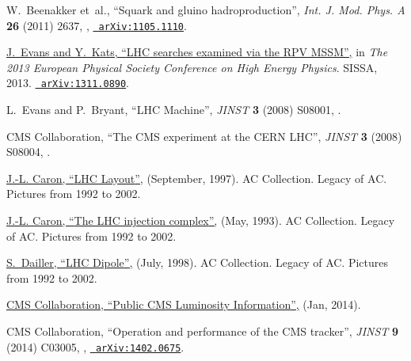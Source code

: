 \documentclass[12pt]{thesis}  %
\begin{document}
\begin{thebibliography}{100}
W.~Beenakker\hrefCMSnoop {} { {et~al.}, ``{Squark and gluino
  hadroproduction}'',} \textit{ Int. J. Mod. Phys. A} \textbf{ 26} (2011) 2637,
  \href{http://dx.doi.org/10.1142/S0217751X11053560}{},
  \href{http://www.arXiv.org/abs/1105.1110}{\texttt{ arXiv:1105.1110}}.

\href {http://pos.sissa.it/archive/conferences/180/287/EPS-HEP 2013_287.pdf}
  {J.~Evans and Y.~Kats, ``{LHC searches examined via the RPV MSSM}'',} in
  \textit{ The 2013 European Physical Society Conference on High Energy
  Physics}.
\newblock SISSA, 2013.
\newblock \href{http://www.arXiv.org/abs/1311.0890}{\texttt{ arXiv:1311.0890}}.

\hrefCMSnoop {} {L.~Evans and P.~Bryant, ``{LHC Machine}'',} \textit{ JINST}
  \textbf{ 3} (2008) S08001,
\href{http://dx.doi.org/10.1088/1748-0221/3/08/S08001}{}.

\hrefCMSnoop {} {{ CMS} Collaboration, ``{The CMS experiment at the CERN
  LHC}'',} \textit{ JINST} \textbf{ 3} (2008) S08004,
\href{http://dx.doi.org/10.1088/1748-0221/3/08/S08004}{}.

\href {http://cds.cern.ch/record/841573} {J.-L. Caron, ``{LHC Layout}'',}
  (September, 1997). AC Collection. Legacy of AC. Pictures from 1992 to 2002.

\href {http://cds.cern.ch/record/841568} {J.-L. Caron, ``{The LHC injection
  complex}'',} (May, 1993). AC Collection. Legacy of AC. Pictures from 1992 to
  2002.

\href {http://cds.cern.ch/record/842253} {S.~Dailler, ``{LHC Dipole}'',} (July,
  1998). AC Collection. Legacy of AC. Pictures from 1992 to 2002.

\href {https://twiki.cern.ch/twiki/bin/view/CMSPublic/LumiPublicResults} {{
  CMS} Collaboration, ``{Public CMS Luminosity Information}'',} (Jan, 2014).

\hrefCMSnoop {} {{ CMS} Collaboration, ``{Operation and performance of the CMS
  tracker}'',} \textit{ JINST} \textbf{ 9} (2014) C03005,
  \href{http://dx.doi.org/10.1088/1748-0221/9/03/C03005}{},
\href{http://www.arXiv.org/abs/1402.0675}{\texttt{ arXiv:1402.0675}}.


\end{thebibliography}
\end{document}
